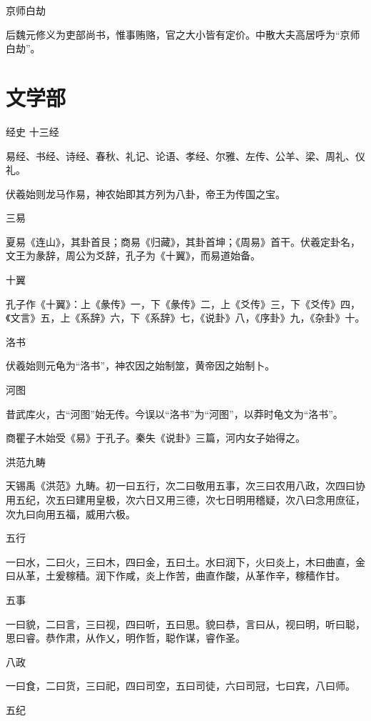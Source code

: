 \documentclass[a4paper,12pt,UTF8,twoside]{ctexbook}
\begin{document}
    京师白劫
    
    后魏元修义为吏部尚书，惟事贿赂，官之大小皆有定价。中散大夫高居呼为“京师白劫”。
    
    
    \part{文学部}
    
    经史
    十三经
    
    易经、书经、诗经、春秋、礼记、论语、孝经、尔雅、左传、公羊、梁、周礼、仪礼。
    
    伏羲始则龙马作易，神农始即其方列为八卦，帝王为传国之宝。
    
    三易
    
    夏易《连山》，其卦首艮；商易《归藏》，其卦首坤；《周易》首干。伏羲定卦名，文王为彖辞，周公为爻辞，孔子为《十翼》，而易道始备。
    
    十翼
    
    孔子作《十翼》：上《彖传》一，下《彖传》二，上《爻传》三，下《爻传》四，《文言》五，上《系辞》六，下《系辞》七，《说卦》八，《序卦》九，《杂卦》十。
    
    洛书
    
    伏羲始则元龟为“洛书”，神农因之始制筮，黄帝因之始制卜。
    
    河图
    
    昔武库火，古“河图”始无传。今误以“洛书”为“河图”，以莽时龟文为“洛书”。
    
    商瞿子木始受《易》于孔子。秦失《说卦》三篇，河内女子始得之。
    
    洪范九畴
    
    天锡禹《洪范》九畴。初一曰五行，次二曰敬用五事，次三曰农用八政，次四曰协用五纪，次五曰建用皇极，次六日又用三德，次七日明用稽疑，次八曰念用庶征，次九曰向用五福，威用六极。
    
    五行
    
    一曰水，二曰火，三曰木，四曰金，五曰土。水曰润下，火曰炎上，木曰曲直，金曰从革，土爰稼穑。润下作咸，炎上作苦，曲直作酸，从革作辛，稼穑作甘。
    
    五事
    
    一曰貌，二曰言，三曰视，四曰听，五曰思。貌曰恭，言曰从，视曰明，听曰聪，思曰睿。恭作肃，从作乂，明作哲，聪作谋，睿作圣。
    
    八政
    
    一曰食，二曰货，三曰祀，四曰司空，五曰司徒，六曰司冠，七曰宾，八曰师。
    
    五纪
    
\end{document}
